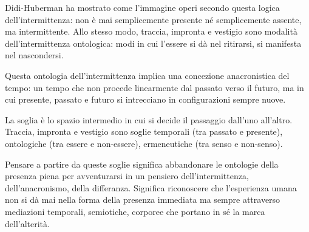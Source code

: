 Didi-Huberman \cite{didi-huberman2002} ha mostrato come l'immagine operi secondo questa logica dell'intermittenza: non è mai semplicemente presente né semplicemente assente, ma intermittente. Allo stesso modo, traccia, impronta e vestigio sono modalità dell'intermittenza ontologica: modi in cui l'essere si dà nel ritirarsi, si manifesta nel nascondersi.


Questa ontologia dell'intermittenza implica una concezione anacronistica del tempo: un tempo che non procede linearmente dal passato verso il futuro, ma in cui presente, passato e futuro si intrecciano in configurazioni sempre nuove.



La soglia è lo spazio intermedio in cui si decide il passaggio dall'uno all'altro. Traccia, impronta e vestigio sono soglie temporali (tra passato e presente), ontologiche (tra essere e non-essere), ermeneutiche (tra senso e non-senso).

Pensare a partire da queste soglie significa abbandonare le ontologie della presenza piena per avventurarsi in un pensiero dell'intermittenza, dell'anacronismo, della differanza. Significa riconoscere che l'esperienza umana non si dà mai nella forma della presenza immediata ma sempre attraverso mediazioni temporali, semiotiche, corporee che portano in sé la marca dell'alterità.
